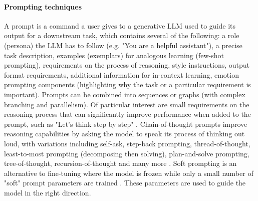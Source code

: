 \documentclass{article}
\begin{document}
\paragraph{Prompting techniques} A prompt is a command a user gives to a generative LLM used to guide its output for a downstream task, which contains several of the following: a role (persona) the LLM has to follow (e.g. "You are a helpful assistant"), a precise task description, examples (exemplars) for analogous learning (few-shot prompting), requirements on the process of reasoning, style instructions, output format requirements, additional information for in-context learning, emotion prompting components (highlighting why the task or a particular requirement is important). Prompts can be combined into sequences or graphs (with complex branching and parallelism). Of particular interest are small requirements on the reasoning process that can significantly improve performance when added to the prompt, such as 
"Let’s think step by step" \cite{kojima2022large}. 
Chain-of-thought prompts improve reasoning capabilities by asking the model to speak its process of thinking out loud, with variations including self-ask, step-back prompting, thread-of-thought, least-to-most prompting (decomposing then solving), plan-and-solve prompting, tree-of-thought, recursion-of-thought and many more \cite{schulhoff2024prompt}. 
Soft prompting is an alternative to fine-tuning where the model is frozen while only a small number of "soft" prompt parameters are trained \cite{lester2021prompt}. These parameters are used to guide the model in the right direction.
\end{document}
